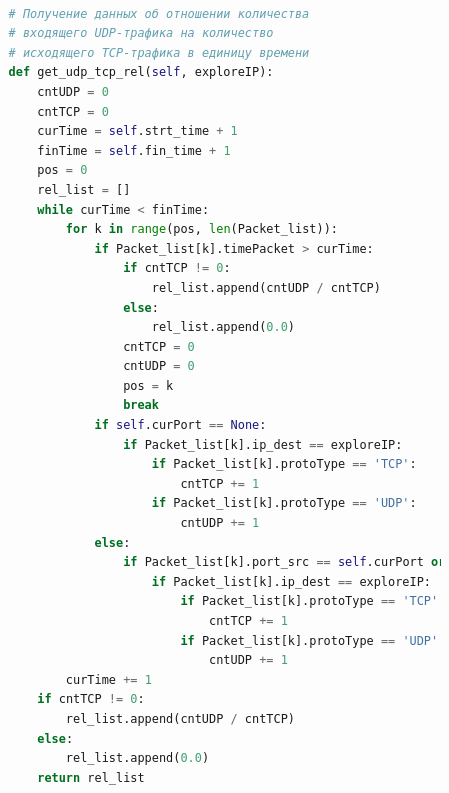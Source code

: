 \documentclass[bachelor, och, coursework]{SCWorks}
\begin{document}
\begin{lstlisting}[language=Python]
      
          # Получение данных об отношении количества
          # входящего UDP-трафика на количество
          # исходящего TCP-трафика в единицу времени
          def get_udp_tcp_rel(self, exploreIP):
              cntUDP = 0
              cntTCP = 0
              curTime = self.strt_time + 1
              finTime = self.fin_time + 1
              pos = 0
              rel_list = []
              while curTime < finTime:
                  for k in range(pos, len(Packet_list)):
                      if Packet_list[k].timePacket > curTime:
                          if cntTCP != 0:
                              rel_list.append(cntUDP / cntTCP)
                          else:
                              rel_list.append(0.0)
                          cntTCP = 0
                          cntUDP = 0
                          pos = k
                          break
                      if self.curPort == None:
                          if Packet_list[k].ip_dest == exploreIP:
                              if Packet_list[k].protoType == 'TCP':
                                  cntTCP += 1
                              if Packet_list[k].protoType == 'UDP':
                                  cntUDP += 1
                      else:
                          if Packet_list[k].port_src == self.curPort or Packet_list[k].port_dest == self.curPort:
                              if Packet_list[k].ip_dest == exploreIP:
                                  if Packet_list[k].protoType == 'TCP':
                                      cntTCP += 1
                                  if Packet_list[k].protoType == 'UDP':
                                      cntUDP += 1
                  curTime += 1
              if cntTCP != 0:
                  rel_list.append(cntUDP / cntTCP)
              else:
                  rel_list.append(0.0)
              return rel_list
      

\end{lstlisting}
\end{document}
